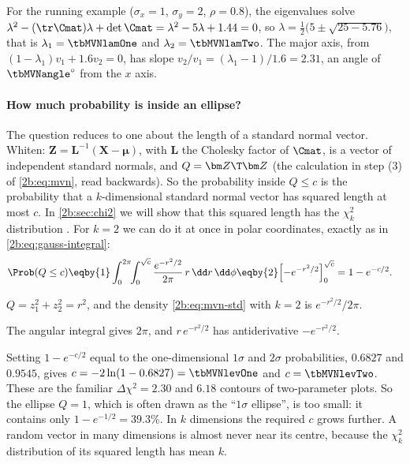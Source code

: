 For the running example ($\sigma_x=1$, $\sigma_y=2$, $\rho=0.8$), the eigenvalues solve $\lambda^2-(\tr\Cmat)\lambda+\det\Cmat=\lambda^2-5\lambda+1.44=0$, so $\lambda=\frac12\bigl(5\pm\sqrt{25-5.76}\bigr)$, that is $\lambda_1=\tbMVNlamOne$ and $\lambda_2=\tbMVNlamTwo$. The major axis, from $(1-\lambda_1)v_1+1.6v_2=0$, has slope $v_2/v_1=(\lambda_1-1)/1.6=2.31$, an angle of $\tbMVNangle^\circ$ from the $x$ axis.

\paragraph{How much probability is inside an ellipse?} The question reduces to one about the length of a standard normal vector. Whiten: $\bm Z=\mathbf L^{-1}(\bm X-\bm\mu)$, with $\mathbf L$ the Cholesky factor of $\Cmat$, is a vector of independent standard normals, and $Q=\bm Z\T\bm Z$ (the calculation in step (3) of \eqref{2b:eq:mvn}, read backwards). So the probability inside $Q\le c$ is the probability that a $k$-dimensional standard normal vector has squared length at most $c$. In \cref{2b:sec:chi2} we will show that this squared length has the $\chi^2_k$ distribution . For $k=2$ we can do it at once in polar coordinates, exactly as in \eqref{2b:eq:gauss-integral}:
\begin{align}
  \Prob(Q\le c)
  &\eqby{1}\int_0^{2\pi}\!\!\int_0^{\sqrt c}\frac{e^{-r^2/2}}{2\pi}\,r\,\dd r\,\dd\phi
   \eqby{2}\Bigl[-e^{-r^2/2}\Bigr]_0^{\sqrt c}
   = 1-e^{-c/2} .
  \label{2b:eq:ellipse-content}
\end{align}
\begin{explain}
  \item $Q=z_1^2+z_2^2=r^2$, and the density \eqref{2b:eq:mvn-std} with $k=2$ is $e^{-r^2/2}/2\pi$.
  \item The angular integral gives $2\pi$, and $r\,e^{-r^2/2}$ has antiderivative $-e^{-r^2/2}$.
\end{explain}
Setting $1-e^{-c/2}$ equal to the one-dimensional $1\sigma$ and $2\sigma$ probabilities, $0.6827$ and $0.9545$, gives $c=-2\ln(1-0.6827)=\tbMVNlevOne$ and $c=\tbMVNlevTwo$. These are the familiar $\Delta\chi^2=2.30$ and $6.18$ contours of two-parameter plots. So the ellipse $Q=1$, which is often drawn as the ``$1\sigma$ ellipse'', is too small: it contains only $1-e^{-1/2}=39.3\%$. In $k$ dimensions the required $c$ grows further. A random vector in many dimensions is almost never near its centre, because the $\chi^2_k$ distribution of its squared length has mean $k$.

